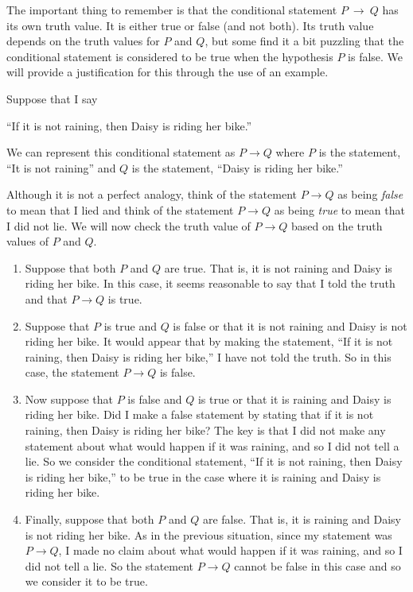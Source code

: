 The important thing to remember is that the conditional statement $P~\to~Q$ has its own truth value.  It is either true or false (and not both).  Its truth value depends on the truth values for $P$ and $Q$, but some find it a bit puzzling that the conditional statement is considered to be true when the hypothesis $P$ is false.  We will provide a justification for this through the use of an example.

\begin{example}
Suppose that I say
\begin{center}
``If it is not raining, then Daisy is riding her bike.''
\end{center}
We can represent this conditional statement as $P \to Q$ where $P$ is the statement, ``It is not raining'' and $Q$ is the statement, ``Daisy is riding her bike.''

Although it is not a perfect analogy, think of the statement $P \to Q$ as being \emph{false} to mean that I lied and think of the statement $P \to Q$ as being \emph{true} to mean that I did not lie.  We will now check the truth value of $P \to Q$ based on the truth values of $P$ and $Q$.

\begin{enumerate}
  \item Suppose that both $P$ and $Q$ are true.  That is, it is not raining and Daisy is riding her bike.  In this case, it seems reasonable to say that I told the truth and that $P \to Q$ is true.
  \item Suppose that $P$ is true and $Q$ is false or that it is not raining and Daisy is not riding her bike.  It would appear that by making the statement, ``If it is not raining, then Daisy is riding her bike,''  I have not told the truth.  So in this case, the statement $P \to Q$ is false.
  \item Now suppose that $P$ is false and $Q$ is true or that it is raining and Daisy is riding her bike.  Did I make a false statement by stating that if it is not raining, then Daisy is riding her bike?  The key is that I did not make any statement about what would happen if it was raining, and so I did not tell a lie.  So we consider the conditional statement, ``If it is not raining, then Daisy is riding her bike,'' to be true in the case where it is raining and Daisy is riding her bike.
  \item Finally, suppose that both $P$ and $Q$ are false.  That is, it is raining and Daisy is not riding her bike.  As in the previous situation, since my statement was $P \to Q$, I made no claim about what would happen if it was raining, and so I did not tell a lie.  So the statement $P \to Q$ cannot be false in this case and so we consider it to be true.
\end{enumerate}

\end{example}

